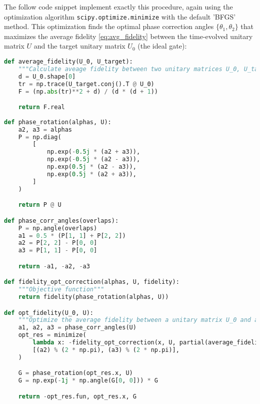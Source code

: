 \documentclass{subfiles}
\begin{document}
The follow code snippet implement exactly this procedure, again using the optimization algorithm \texttt{scipy.optimize.minimize} with the default 'BFGS' method. This optimization finds the optimal phase correction angles $\{\theta_1, \theta_2\}$ that maximizes the average fidelity \eqref{eq:avg_fidelity} between the time-evolved unitary matrix $U$ and the target unitary matrix $U_0$ (the ideal gate): 
\begin{lstlisting}[language=Python]
def average_fidelity(U_0, U_target):
    """Calculate aveage fidelity between two unitary matrices U_0, U_target."""
    d = U_0.shape[0]
    tr = np.trace(U_target.conj().T @ U_0)
    F = (np.abs(tr)**2 + d) / (d * (d + 1))

    return F.real
 
def phase_rotation(alphas, U):
    a2, a3 = alphas
    P = np.diag(
        [
            np.exp(-0.5j * (a2 + a3)),
            np.exp(-0.5j * (a2 - a3)),
            np.exp(0.5j * (a2 - a3)),
            np.exp(0.5j * (a2 + a3)),
        ]
    )

    return P @ U

def phase_corr_angles(overlaps):
    P = np.angle(overlaps)
    a1 = 0.5 * (P[1, 1] + P[2, 2])
    a2 = P[2, 2] - P[0, 0]
    a3 = P[1, 1] - P[0, 0]

    return -a1, -a2, -a3

def fidelity_opt_correction(alphas, U, fidelity):
    """Objective function"""
    return fidelity(phase_rotation(alphas, U))

def opt_fidelity(U_0, U):
    """Optimize the average fidelity between a unitary matrix U_0 and a unitary matrix U"""
    a1, a2, a3 = phase_corr_angles(U)
    opt_res = minimize(
        lambda x: -fidelity_opt_correction(x, U, partial(average_fidelity, U_0)),
        [(a2) % (2 * np.pi), (a3) % (2 * np.pi)],
    )

    G = phase_rotation(opt_res.x, U)
    G = np.exp(-1j * np.angle(G[0, 0])) * G

    return -opt_res.fun, opt_res.x, G
\end{lstlisting}
\end{document}

